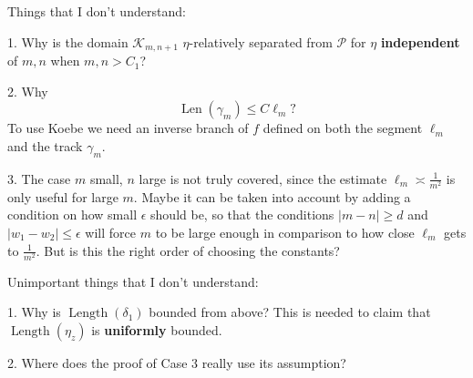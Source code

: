 Things that I don't understand:

1. Why is the domain $\mathcal K_{m,n+1}$ $\eta$-relatively separated from $\mathcal P$ for $\eta$ \textbf{independent} of $m,n$ when $m,n>C_1$?

2. Why $$\operatorname{Len}(\gamma_m) \leq C \ell_m?$$
To use Koebe we need an inverse branch of $f$ defined on both the segment $\ell_m$ and the track $\gamma_m$.

3. The case $m$ small, $n$ large is not truly covered, since the estimate $\ell_m \asymp \frac 1{m^2}$ is only useful for large $m$. 
Maybe it can be taken into account by adding a condition on how small $\epsilon$ should be, so that the conditions $|m-n| \geq d$ and $|w_1-w_2| \leq \epsilon$ will force $m$ to be large enough in comparison to how close $\ell _m$ gets to $\frac 1{m^2}$.
But is this the right order of choosing the constants?








Unimportant things that I don't understand:

1. Why is $\operatorname{Length}(\delta_1)$ bounded from above? This is needed to claim that $\operatorname{Length}(\eta_z)$ is \textbf{uniformly} bounded.

2. Where does the proof of Case 3 really use its assumption?